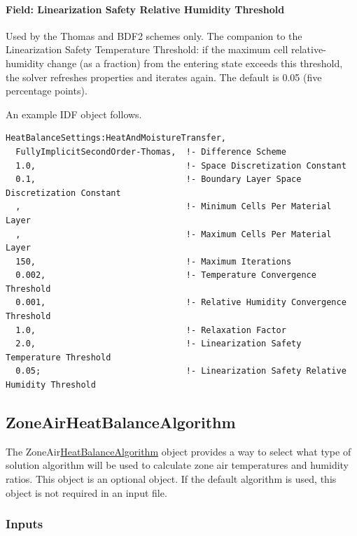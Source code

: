 \paragraph{Field: Linearization Safety Relative Humidity Threshold}\label{field-linearization-safety-relative-humidity-threshold}

Used by the Thomas and BDF2 schemes only. The companion to the Linearization Safety Temperature Threshold: if the maximum cell relative-humidity change (as a fraction) from the entering state exceeds this threshold, the solver refreshes properties and iterates again. The default is 0.05 (five percentage points).

An example IDF object follows.

\begin{lstlisting}
HeatBalanceSettings:HeatAndMoistureTransfer,
  FullyImplicitSecondOrder-Thomas,  !- Difference Scheme
  1.0,                              !- Space Discretization Constant
  0.1,                              !- Boundary Layer Space Discretization Constant
  ,                                 !- Minimum Cells Per Material Layer
  ,                                 !- Maximum Cells Per Material Layer
  150,                              !- Maximum Iterations
  0.002,                            !- Temperature Convergence Threshold
  0.001,                            !- Relative Humidity Convergence Threshold
  1.0,                              !- Relaxation Factor
  2.0,                              !- Linearization Safety Temperature Threshold
  0.05;                             !- Linearization Safety Relative Humidity Threshold
\end{lstlisting}

\subsection{ZoneAirHeatBalanceAlgorithm}\label{zoneairheatbalancealgorithm}

The ZoneAir\hyperref[heatbalancealgorithm]{HeatBalanceAlgorithm} object provides a way to select what type of solution algorithm will be used to calculate zone air temperatures and humidity ratios. This object is an optional object. If the default algorithm is used, this object is not required in an input file.

\subsubsection{Inputs}\label{inputs-8-023}


